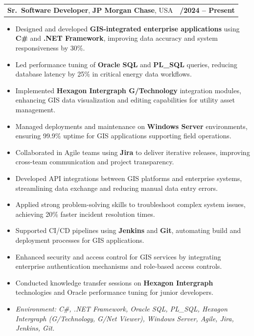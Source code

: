 \documentclass[letterpaper,11pt]{article}
\makeatletter
\newcommand{\resumeItem}[1]{
  \item\footnotesize{
    {#1 \vspace{-2pt}}
  }
}
\newcommand{\resumeSubheading}[4]{
  \vspace{-2pt}\item
    \begin{tabular*}{1.0\textwidth}[t]{l@{\extracolsep{\fill}}r}
      \textbf{\fontsize{10pt}{14pt}\selectfont #3}, \textbf{\fontsize{10pt}{14pt}\selectfont #1}, \fontsize{10pt}{14pt}\selectfont #4 & \textbf{\fontsize{10pt}{14pt}\selectfont #2} \\
    \end{tabular*}\vspace{-7pt}
}
\newcommand{\resumeItemListStart}{\begin{itemize}[leftmargin=*]}
\newcommand{\resumeItemListEnd}{\end{itemize}\vspace{-5pt}}
\makeatother
\begin{document}
\resumeSubheading
{JP Morgan Chase}{09/2024 -- Present}
{Sr.\ Software Developer}{USA}
\resumeItemListStart
  \resumeItem{Designed and developed \textbf{GIS-integrated enterprise applications} using \textbf{C\#} and \textbf{.NET Framework}, improving data accuracy and system responsiveness by 30\%.}
  \resumeItem{Led performance tuning of \textbf{Oracle SQL} and \textbf{PL\_SQL} queries, reducing database latency by 25\% in critical energy data workflows.}
  \resumeItem{Implemented \textbf{Hexagon Intergraph G/Technology} integration modules, enhancing GIS data visualization and editing capabilities for utility asset management.}
  \resumeItem{Managed deployments and maintenance on \textbf{Windows Server} environments, ensuring 99.9\% uptime for GIS applications supporting field operations.}
  \resumeItem{Collaborated in Agile teams using \textbf{Jira} to deliver iterative releases, improving cross-team communication and project transparency.}
  \resumeItem{Developed API integrations between GIS platforms and enterprise systems, streamlining data exchange and reducing manual data entry errors.}
  \resumeItem{Applied strong problem-solving skills to troubleshoot complex system issues, achieving 20\% faster incident resolution times.}
  \resumeItem{Supported CI/CD pipelines using \textbf{Jenkins} and \textbf{Git}, automating build and deployment processes for GIS applications.}
  \resumeItem{Enhanced security and access control for GIS services by integrating enterprise authentication mechanisms and role-based access controls.}
  \resumeItem{Conducted knowledge transfer sessions on \textbf{Hexagon Intergraph} technologies and Oracle performance tuning for junior developers.}
  \resumeItem{\textit{Environment: C\#, .NET Framework, Oracle SQL, PL\_SQL, Hexagon Intergraph (G/Technology, G/Net Viewer), Windows Server, Agile, Jira, Jenkins, Git.}}
\resumeItemListEnd
\end{document}
